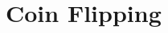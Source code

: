 \documentclass[acmsmall, screen, review, anonymous]{acmart}
\begin{document}
\section{Coin Flipping} \label{app:flip}


%

%

%

\pagebreak

%

%

%
%
%
%
%
%
%
%
%
\end{document}
